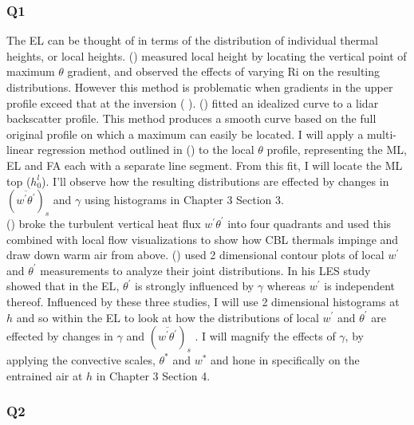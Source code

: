 \subsubsection{Q1}     
The \acs{EL} can be thought of in terms of the distribution of individual thermal heights, or local heights. \citeauthor{SullMoengStev} (\citeyear{SullMoengStev}) measured local height by locating the vertical point of maximum $\theta$ gradient, and observed the effects of varying \acs{Ri} on the resulting distributions. However this method is problematic when gradients in the upper profile exceed that at the inversion (\citeauthor{BrooksFowler2} \citeyear{BrooksFowler2}).  \citeauthor{SteynBaldHoff} (\citeyear{SteynBaldHoff}) fitted an idealized curve to a lidar backscatter profile.  This method produces a smooth curve based on the full original profile on which a maximum can easily be located.  I will apply a multi-linear regression method outlined in \citeauthor{Vieth} (\citeyear{Vieth}) to the local $\theta$ profile, representing the \acs{ML}, \acs{EL} and \acs{FA} each with a separate line segment. From this fit, I will locate the \acs{ML} top ($h^{l}_{0}$).  I'll observe how the resulting distributions are effected by changes in $(\overline{w^{'}\theta^{'}})_{s}$ and $\gamma$ using histograms in Chapter 3 Section 3.\\

\citeauthor{SullMoengStev} (\citeyear{SullMoengStev}) broke the turbulent vertical heat flux $w^{'}\theta^{'}$ into four quadrants and used this combined with local flow visualizations to show how \acs{CBL} thermals impinge and draw down warm air from above. \citeauthor{MahrtPaum} (\citeyear{MahrtPaum}) used 2 dimensional contour plots of local $w^{'}$ and $\theta^{'}$ measurements to analyze their joint distributions.  In his \citeyear{Sorbjan} \acs{LES} study \citeauthor{Sorbjan} showed that in the \acs{EL}, $\theta^{'}$ is strongly influenced by $\gamma$  whereas $w^{'}$ is independent thereof.  Influenced by these three studies, I will use 2 dimensional histograms at $h$ and so within the \acs{EL} to look at how the distributions of local $w^{'}$ and $\theta^{'}$ are effected by changes in $\gamma$ and $(\overline{w^{'}\theta^{'}})_{s}$ .  I will magnify the effects of $\gamma$, by applying the convective scales, $\theta^{*}$ and $w^{*}$ and hone in specifically on the entrained air at $h$ in Chapter 3 Section 4.\\    

\subsubsection{Q2}
       
